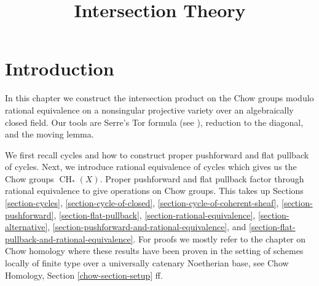 \documentclass{stacks-project}
\theoremstyle{plain}
\theoremstyle{definition}
\theoremstyle{remark}
\numberwithin{equation}{subsection}
\def\CH{\mathop{\mathrm{CH}}\nolimits}
\begin{document}
\title{Intersection Theory}


\maketitle

\label{section-phantom}

\tableofcontents


\section{Introduction}
\label{section-introduction}

\noindent
In this chapter we construct the intersection product on the Chow groups
modulo rational equivalence on a nonsingular projective variety over an
algebraically closed field. Our tools are Serre's Tor formula
(see \cite[Chapter V]{Serre_algebre_locale}), reduction to the diagonal,
and the moving lemma.

\medskip\noindent
We first recall cycles and how to construct proper pushforward and
flat pullback of cycles. Next, we introduce rational equivalence of cycles
which gives us the Chow groups $\CH_*(X)$. Proper pushforward and flat pullback
factor through rational equivalence to give operations on Chow groups.
This takes up Sections 
\ref{section-cycles},
\ref{section-cycle-of-closed},
\ref{section-cycle-of-coherent-sheaf},
\ref{section-pushforward},
\ref{section-flat-pullback},
\ref{section-rational-equivalence},
\ref{section-alternative},
\ref{section-pushforward-and-rational-equivalence}, and
\ref{section-flat-pullback-and-rational-equivalence}.
For proofs we mostly refer to the chapter on Chow homology
where these results have been proven in the setting of
schemes locally of finite type over a universally catenary Noetherian base, see
Chow Homology, Section \ref{chow-section-setup} ff.
\end{document}

